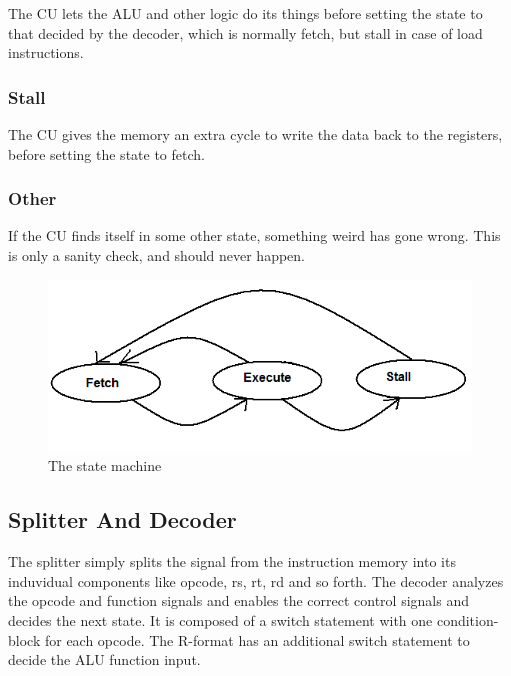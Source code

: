 The CU lets the ALU and other logic do its things before setting the state to that
decided by the decoder, which is normally fetch, but stall in case of load instructions.

\subsubsection{Stall}

The CU gives the memory an extra cycle to write the data back to the registers, before setting the state to fetch.

\subsubsection{Other}

If the CU finds itself in some other state, something weird has gone wrong.
This is only a sanity check, and should never happen.

\begin{figure}[ht]
    \centering
    \includegraphics[scale=0.5]{figures/controlunitstatemachine.png}
    \caption{\label{fig:stateMachine}The state machine}
\end{figure}

\subsection{Splitter And Decoder}

The splitter simply splits the signal from the instruction memory into
its induvidual components like opcode, rs, rt, rd and so forth.
The decoder analyzes the opcode and function signals
and enables the correct control signals and decides the next state.
It is composed of a switch statement with one condition-block for each opcode.
The R-format has an additional switch statement to decide the ALU function input.

